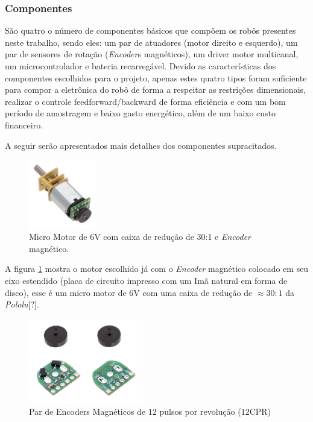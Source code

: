 \subsubsection{Componentes}

São quatro o número de componentes básicos que compõem os robôs presentes neste trabalho, sendo eles: um par de atuadores (motor direito e esquerdo), um par de sensores de rotação (\textit{Encoder}s magnéticos), um driver motor multicanal, um microcontrolador e bateria recarregável. Devido as características dos componentes escolhidos para o projeto, apenas estes quatro tipos foram suficiente para compor a eletrônica do robô de forma a respeitar as restrições dimensionais, realizar o controle feedforward/backward de forma eficiência e com um bom período de amostragem e baixo gasto energético, além de um baixo custo financeiro.

A seguir serão apresentados mais detalhes dos componentes supracitados.

\begin{figure}[H]
    \centering
    \includegraphics[width=3cm]{imagens/eletronica/motor_com_encoder.jpg}
    \caption{Micro Motor de 6V com caixa de redução de 30:1 e \textit{Encoder} magnético.}
    \label{fig:motor_com_encoder}
\end{figure}

A figura \ref{fig:motor_com_encoder} mostra o motor escolhido já com o \textit{Encoder} magnético colocado em seu eixo estendido (placa de circuito impresso com um Imã natural em forma de disco), esse é um micro motor de $6$V com uma caixa de redução de $\approx 30:1$ da \textit{Pololu}[?].

\begin{figure}[H]
    \centering
    \includegraphics[width=5cm]{imagens/eletronica/encoder_frente_verso.jpg}
    \caption{Par de Encoders Magnéticos de $12$ pulsos por revolução ($12$CPR)}
    \label{fig:encoder}
\end{figure}

